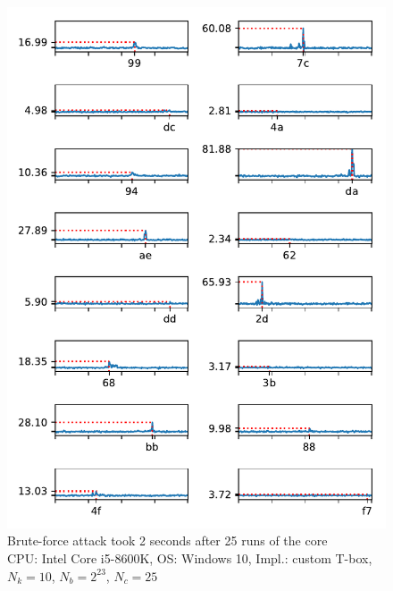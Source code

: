 \documentclass[thesis=B,english]{FITthesis}[2019/03/06]
\begin{document}
\begin{figure}
	\centering
	\includegraphics{full_tbox_desktop_success.pdf}
	\caption[Custom T-box on Windows using Core i5-8600K CPU]{Brute-force attack took 2 seconds after 25 runs of the core \\
	CPU: Intel Core i5-8600K, OS: Windows 10, Impl.: custom T-box, $N_k = 10$, $N_b = 2^{23}$, $N_c = 25$}
\end{figure}
\end{document}
